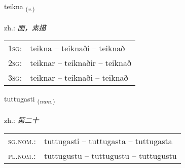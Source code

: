 \documentclass[frontgrid, backgrid]{flacards}\usepackage[]{graphicx}\usepackage[]{xcolor}
\begin{document}
\renewcommand{\flhead}{\vskip5pt \fboxsep=0pt {\small\bfseries\footnotesize Sagnorð | 动词}}
\renewcommand{\fcfoot}{\vskip5pt \fboxsep=0pt \hspace{2pt}{\small\bfseries\footnotesize 3K}}

\renewcommand{\blhead}{\vskip5pt {\small\bfseries\footnotesize Sagnorð | 动词 }}
\renewcommand{\bcfoot}{\vskip5pt \hspace{2pt}{\small\bfseries\footnotesize 3K}}


{teikna \small{\textsubscript{(\textit{v.})}} \\[1ex] %
\textphonetic{[tʰeihkna]} \\
zh.: \emph{画，素描} \\  [2ex]
\renewcommand*{\arraystretch}{0.8}
\begin{tabular}{p{1cm}l}
\textsc{1sg}: & teikna -- teiknaði -- teiknað \\ 
\textsc{2sg}: & teiknar -- teiknaðir -- teiknað \\ 
\textsc{3sg}: & teiknar -- teiknaði -- teiknað \\ 
\end{tabular}
}

\renewcommand{\flhead}{\vskip5pt \fboxsep=0pt {\small\bfseries\footnotesize Töluorð | 数量词}}
\renewcommand{\fcfoot}{\vskip5pt \fboxsep=0pt \hspace{2pt}{\small\bfseries\footnotesize 3K}}

\renewcommand{\blhead}{\vskip5pt {\small\bfseries\footnotesize Töluorð | 数量词 }}
\renewcommand{\bcfoot}{\vskip5pt \hspace{2pt}{\small\bfseries\footnotesize 3K}}


{tuttugasti \small{\textsubscript{(\textit{num.})}} \\[1ex] %
\textphonetic{[tʰʏhtʏɣastɪ]} \\
zh.: \emph{第二十} \\  [2ex]
\renewcommand*{\arraystretch}{0.8}
\begin{tabular}{ll}
\textsc{sg.nom.}: & tuttugasti  --  tuttugasta -- tuttugasta \\ 
\textsc{pl.nom.}: & tuttugustu -- tuttugustu -- tuttugustu
\end{tabular}
}
\end{document}
